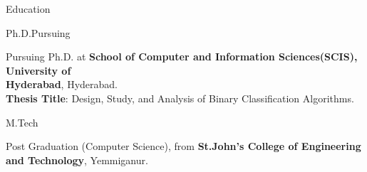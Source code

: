 \documentclass{resume} %
\begin{document}

\begin{rSection}{Education}
	
\begin{rSubsection}{Ph.D.}{Pursuing}{}{}	
	\item Pursuing Ph.D. at \textbf{School of Computer and Information Sciences(SCIS), University of \\ Hyderabad}, Hyderabad. \\
	\textbf{Thesis Title}: Design, Study, and Analysis of Binary Classification Algorithms.
\end{rSubsection}

\begin{rSubsection}{M.Tech}{}{}{}%
	\item Post Graduation (Computer Science), from \textbf{St.John's College of Engineering and Technology}, Yemmiganur.
\end{rSubsection}

\end{rSection}


\end{document}
